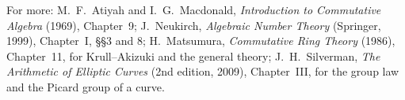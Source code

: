For more: M.~F.~Atiyah and I.~G.~Macdonald, \emph{Introduction to Commutative Algebra} (1969), Chapter~9; J.~Neukirch, \emph{Algebraic Number Theory} (Springer, 1999), Chapter~I, \S\S3 and 8; H.~Matsumura, \emph{Commutative Ring Theory}
(1986), Chapter~11, for Krull--Akizuki and the general theory; J.~H.~Silverman, \emph{The Arithmetic of Elliptic Curves} (2nd edition, 2009), Chapter~III, for the group law and the Picard group of a curve.
